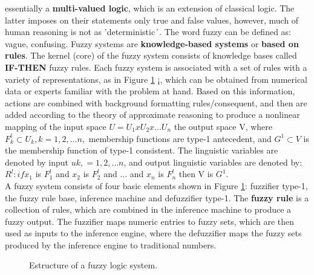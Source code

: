 essentially a \textbf{multi-valued logic}\cite{zadeh1965fuzzy}, which
is an extension of classical logic. The latter imposes on their
statements only true and false values, however, much of human
reasoning is not as 'deterministic´. The word fuzzy can be defined as:
vague, confusing. Fuzzy systems are \textbf {knowledge-based systems}
or \textbf{based on rules}. The kernel (core) of the fuzzy system
consists of knowledge bases called \textbf {IF-THEN} fuzzy rules.
Each fuzzy system is associated with a set of rules with a variety of
representations, as in Figure \ref{fig:fuzzyset} ¡, which can be
obtained from numerical data or experts familiar with the problem at
hand. Based on this information, actions are combined with background
formatting rules/consequent, and then are added according to the
theory of approximate reasoning to produce a nonlinear mapping of the
input space $ U=U_1 xU_2 x…U_n$ the output space V, where $
F_k^l⊂U_k,k=1,2,…n,$ membership functions are type-1 antecedent, and $
G^1⊂V $ is the membership function of type-1 consistent. The
linguistic variables\cite{dubois1980fuzzy} are denoted by input $uk,
=1,2,…n $, and output linguistic variables are denoted by: $R^l: if
x_1$ is $F_1^l $ and $x_{2}$ is $F_2^l$ and ... and $x_n$ is $F_n^l$
then V is $G^1$.\\ A fuzzy system consists of four basic elements
shown in Figure \ref{fig:fuzzyset}: fuzzifier type-1, the fuzzy rule
base, inference machine and defuzzifier type-1. The \textbf{fuzzy
rule} is a collection of rules, which are combined in the inference
machine to produce a fuzzy output. The fuzzifier maps numeric entries
to fuzzy sets, which are then used as inputs to the inference engine,
where the defuzzifier maps the fuzzy sets produced by the inference
engine to traditional numbers.
\begin{figure} \captionsetup{justification=centering,margin=2cm} 
\centering
\setlength\fboxsep{0pt} \setlength\fboxrule{0.7pt}
\caption{Estructure of a fuzzy logic system.}
\label{fig:fuzzyset} 
\end{figure} 

